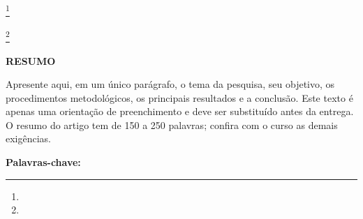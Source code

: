 %
\begin{center}
  \textbf{\ABNTEXchapterfont\MakeUppercase{\imprimirtitulo}}
\end{center}

\begin{flushright}
  \imprimirautor\footnote{\notadoautor}

  \imprimirorientador\footnote{\notadoorientador}

\end{flushright}

\begin{center}
  \textbf{RESUMO}
\end{center}

\begingroup
\SingleSpacing
\noindent Apresente aqui, em um único parágrafo, o tema da pesquisa, seu objetivo,
os procedimentos metodológicos, os principais resultados e a conclusão.
Este texto é apenas uma orientação de preenchimento e deve ser substituído
antes da entrega. O resumo do artigo tem de 150 a 250 palavras; confira com
o curso as demais exigências.
\par
\noindent\textbf{Palavras-chave:} \palavraschave
\par
\endgroup

